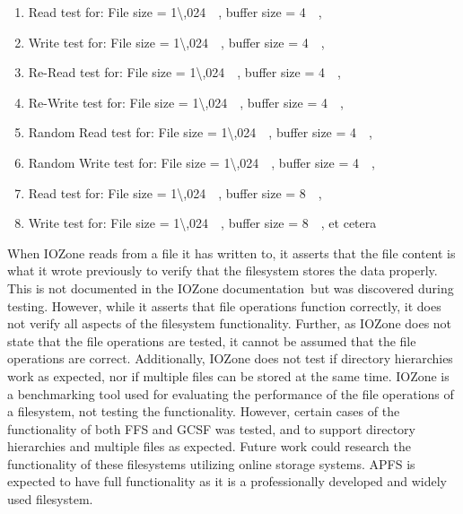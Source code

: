 \begin{enumerate}
	\item Read test for: File size = \SI{1\,024}{\kilo\byte}, buffer size = \SI{4}{\kilo\byte},
	\item Write test for: File size = \SI{1\,024}{\kilo\byte}, buffer size = \SI{4}{\kilo\byte},
	\item Re-Read test for: File size = \SI{1\,024}{\kilo\byte}, buffer size = \SI{4}{\kilo\byte},
	\item Re-Write test for: File size = \SI{1\,024}{\kilo\byte}, buffer size = \SI{4}{\kilo\byte},
	\item Random Read test for: File size = \SI{1\,024}{\kilo\byte}, buffer size = \SI{4}{\kilo\byte},
	\item Random Write test for: File size = \SI{1\,024}{\kilo\byte}, buffer size = \SI{4}{\kilo\byte},
	\item Read test for: File size = \SI{1\,024}{\kilo\byte}, buffer size = \SI{8}{\kilo\byte},
	\item Write test for: File size = \SI{1\,024}{\kilo\byte}, buffer size = \SI{8}{\kilo\byte}, et cetera
\end{enumerate}

When IOZone reads from a file it has written to, it asserts that the file content is what it wrote previously to verify that the filesystem stores the data properly. This is not documented in the IOZone documentation\,\cite{iozoneIozoneFilesystemBenchmark} but was discovered during testing. However, while it asserts that file operations function correctly, it does not verify all aspects of the filesystem functionality. Further, as IOZone does not state that the file operations are tested, it cannot be assumed that the file operations are correct. Additionally, IOZone does not test if directory hierarchies work as expected, nor if multiple files can be stored at the same time. IOZone is a benchmarking tool used for evaluating the performance of the file operations of a filesystem, not testing the functionality. However, certain cases of the functionality of both \gls{FFS} and \gls{GCSF} was tested, and to support directory hierarchies and multiple files as expected. Future work could research the functionality of these filesystems utilizing online storage systems. \gls{APFS} is expected to have full functionality as it is a professionally developed and widely used filesystem.

